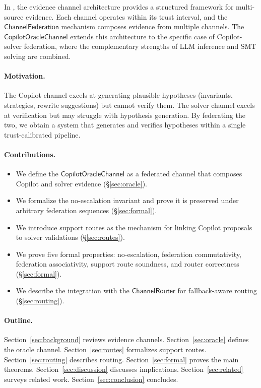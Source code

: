 \documentclass[11pt]{article}
\newcommand{\CopOracle}{\mathsf{CopilotOracleChannel}}
\newcommand{\ChanFed}{\mathsf{ChannelFederation}}
\newcommand{\ChanRouter}{\mathsf{ChannelRouter}}
\begin{document}
In \JuGeo{}, the evidence channel architecture provides a structured
framework for multi-source evidence.  Each channel operates within
its trust interval, and the $\ChanFed$ mechanism composes evidence
from multiple channels.  The $\CopOracle$ extends this architecture
to the specific case of Copilot-solver federation, where the
complementary strengths of LLM inference and SMT solving are
combined.

\paragraph{Motivation.}
The Copilot channel excels at generating plausible hypotheses
(invariants, strategies, rewrite suggestions) but cannot verify
them.  The solver channel excels at verification but may struggle
with hypothesis generation.  By federating the two, we obtain a
system that generates and verifies hypotheses within a single
trust-calibrated pipeline.

\paragraph{Contributions.}
\begin{itemize}[leftmargin=2em]
\item We define the $\CopOracle$ as a federated channel that
  composes Copilot and solver evidence (\S\ref{sec:oracle}).

\item We formalize the no-escalation invariant and prove it is
  preserved under arbitrary federation sequences (\S\ref{sec:formal}).

\item We introduce support routes as the mechanism for linking
  Copilot proposals to solver validations (\S\ref{sec:routes}).

\item We prove five formal properties: no-escalation, federation
  commutativity, federation associativity, support route soundness,
  and router correctness (\S\ref{sec:formal}).

\item We describe the integration with the $\ChanRouter$ for
  fallback-aware routing (\S\ref{sec:routing}).
\end{itemize}

\paragraph{Outline.}
Section~\ref{sec:background} reviews evidence channels.
Section~\ref{sec:oracle} defines the oracle channel.
Section~\ref{sec:routes} formalizes support routes.
Section~\ref{sec:routing} describes routing.
Section~\ref{sec:formal} proves the main theorems.
Section~\ref{sec:discussion} discusses implications.
Section~\ref{sec:related} surveys related work.
Section~\ref{sec:conclusion} concludes.
\end{document}
